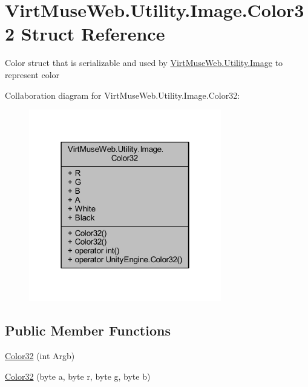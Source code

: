 \hypertarget{struct_virt_muse_web_1_1_utility_1_1_image_1_1_color32}{}\section{Virt\+Muse\+Web.\+Utility.\+Image.\+Color32 Struct Reference}
\label{struct_virt_muse_web_1_1_utility_1_1_image_1_1_color32}


Color struct that is serializable and used by \mbox{\hyperlink{class_virt_muse_web_1_1_utility_1_1_image}{Virt\+Muse\+Web.\+Utility.\+Image}} to represent color  




Collaboration diagram for Virt\+Muse\+Web.\+Utility.\+Image.\+Color32\+:
\nopagebreak
\begin{figure}[H]
\begin{center}
\leavevmode
\includegraphics[width=238pt]{struct_virt_muse_web_1_1_utility_1_1_image_1_1_color32__coll__graph}
\end{center}
\end{figure}
\subsection*{Public Member Functions}
\begin{DoxyCompactItemize}
\item 
\mbox{\hyperlink{struct_virt_muse_web_1_1_utility_1_1_image_1_1_color32_a01229f7dab8abe7d5cc188dc21b964d0}{Color32}} (int Argb)
\item 
\mbox{\hyperlink{struct_virt_muse_web_1_1_utility_1_1_image_1_1_color32_afe94ff8c63e8518b4d0d1c37e2b18e7d}{Color32}} (byte a, byte r, byte g, byte b)
\end{DoxyCompactItemize}
